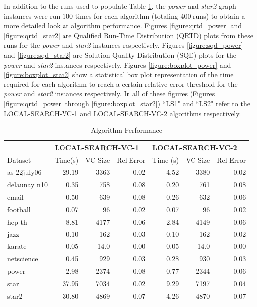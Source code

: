 \documentclass[sigconf]{acmart}
\begin{document}
In addition to the runs used to populate Table \ref{table:algperf}, the \textit{power} and \textit{star2} graph instances were run 100 times for each algorithm (totaling 400 runs) to obtain a more detailed look at algorithm performance. Figures \ref{figure:qrtd_power} and \ref{figure:qrtd_star2} are Qualified Run-Time Distribution (QRTD) plots from these runs for the \textit{power} and \textit{star2} instances respectively. Figures \ref{figure:sqd_power} and \ref{figure:sqd_star2} are Solution Quality Distribution (SQD) plots for the \textit{power} and \textit{star2} instances respectively. Figures \ref{figure:boxplot_power} and \ref{figure:boxplot_star2} show a statistical box plot representation of the time required for each algorithm to reach a certain relative error threshold for the \textit{power} and \textit{star2} instances respectively. In all of these figures (Figures \ref{figure:qrtd_power} through \ref{figure:boxplot_star2}) ``LS1" and ``LS2" refer to the LOCAL-SEARCH-VC-1 and LOCAL-SEARCH-VC-2 algorithms respectively.

\begin{table}[h]
	\caption{Algorithm Performance}
	\label{table:algperf}
	\begin{tabular}{lrrrrrr}
		\toprule
		& \multicolumn{3}{l}{LOCAL-SEARCH-VC-1} & \multicolumn{3}{l}{LOCAL-SEARCH-VC-2} \\ \midrule
		Dataset & Time(s)    & VC Size   & Rel Error  & Time (s)   & VC Size   & Rel Error  \\ \midrule
		as-22july06    & 29.19   & 3363      & 0.02   & 4.52   & 3380      & 0.02   \\
		delaunay n10    & 0.35   & 758      & 0.08   & 0.20   & 761      & 0.08   \\
		email    & 0.50   & 639      & 0.08   & 0.26   & 632      & 0.06   \\
		football    & 0.07   & 96      & 0.02   & 0.07   & 96      & 0.02   \\
		hep-th    & 8.81   & 4177      & 0.06   & 2.84   & 4149      & 0.06   \\
		jazz    & 0.10   & 162      & 0.03   & 0.10   & 162      & 0.02   \\
		karate    & 0.05   & 14.0      & 0.00   & 0.05   & 14.0      & 0.00   \\
		netscience    & 0.45   & 929      & 0.03   & 0.28   & 930      & 0.03   \\
		power    & 2.98   & 2374      & 0.08   & 0.77   & 2344      & 0.06   \\
		star    & 37.95   & 7034      & 0.02   & 9.29   & 7197      & 0.04   \\
		star2    & 30.80   & 4869      & 0.07   & 4.26   & 4870      & 0.07   \\
		\bottomrule
	\end{tabular}
\end{table}
\end{document}
